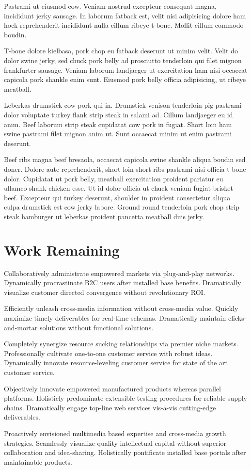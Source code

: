 \documentclass{icisdoc}
\begin{document}
Pastrami ut eiusmod cow. Veniam nostrud excepteur consequat magna, incididunt
jerky sausage. In laborum fatback est, velit nisi adipisicing dolore ham hock
reprehenderit incididunt nulla cillum ribeye t-bone. Mollit cillum commodo
boudin.

T-bone dolore kielbasa, pork chop eu fatback deserunt ut minim velit. Velit do
dolor swine jerky, sed chuck pork belly ad prosciutto tenderloin qui filet
mignon frankfurter sausage. Veniam laborum landjaeger ut exercitation ham nisi
occaecat capicola pork shankle enim sunt. Eiusmod pork belly officia
adipisicing, ut ribeye meatball.

Leberkas drumstick cow pork qui in. Drumstick venison tenderloin pig pastrami
dolor voluptate turkey flank strip steak in salami ad. Cillum landjaeger eu id
anim. Beef laborum strip steak cupidatat cow pork in fugiat. Short loin ham
swine pastrami filet mignon anim ut. Sunt occaecat minim ut enim pastrami
deserunt.

Beef ribs magna beef bresaola, occaecat capicola swine shankle aliqua boudin sed
doner. Dolore aute reprehenderit, short loin short ribs pastrami nisi officia
t-bone dolor. Cupidatat ut pork belly, meatball exercitation proident pariatur
eu ullamco shank chicken esse. Ut id dolor officia ut chuck veniam fugiat
brisket beef. Excepteur qui turkey deserunt, shoulder in proident consectetur
aliqua culpa drumstick est cow jerky labore. Ground round tenderloin pork chop
strip steak hamburger ut leberkas proident pancetta meatball duis jerky.

\chapter{Work Remaining}
Collaboratively administrate empowered markets via plug-and-play
networks. Dynamically procrastinate B2C users after installed base
benefits. Dramatically visualize customer directed convergence without
revolutionary ROI.

Efficiently unleash cross-media information without cross-media value. Quickly
maximize timely deliverables for real-time schemas. Dramatically maintain
clicks-and-mortar solutions without functional solutions.

Completely synergize resource sucking relationships via premier niche
markets. Professionally cultivate one-to-one customer service with robust
ideas. Dynamically innovate resource-leveling customer service for state of the
art customer service.

Objectively innovate empowered manufactured products whereas parallel
platforms. Holisticly predominate extensible testing procedures for reliable
supply chains. Dramatically engage top-line web services vis-a-vis cutting-edge
deliverables.

Proactively envisioned multimedia based expertise and cross-media growth
strategies. Seamlessly visualize quality intellectual capital without superior
collaboration and idea-sharing. Holistically pontificate installed base portals
after maintainable products.
\end{document}
